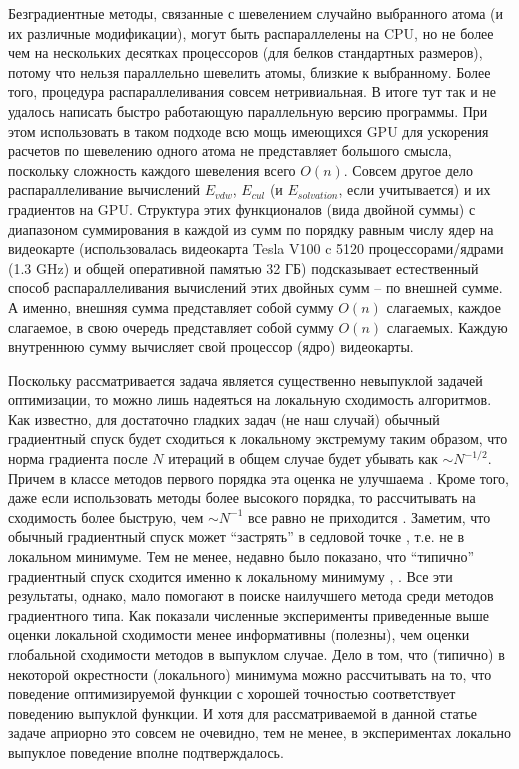   Безградиентные методы, связанные с шевелением случайно выбранного атома (и их различные модификации), могут быть распараллелены на CPU, но не более чем на нескольких десятках процессоров (для белков стандартных размеров), потому что нельзя параллельно шевелить атомы, близкие к выбранному. Более того, процедура распараллеливания совсем нетривиальная. В итоге тут так и не удалось написать быстро работающую параллельную версию программы. При этом использовать в таком подходе всю мощь имеющихся GPU для ускорения расчетов по шевелению одного атома не представляет большого смысла, поскольку сложность каждого шевеления всего ${O}\left( n \right)$. Совсем другое дело распараллеливание вычислений $E_{vdw}$, $E_{cul}$ (и $E_{solvation}$, если учитывается) и их градиентов на GPU. Структура этих функционалов (вида двойной суммы) с диапазоном суммирования в каждой из сумм по порядку равным числу ядер на видеокарте (использовалась видеокарта Tesla V100 c 5120 процессорами/ядрами (1.3 GHz) и общей оперативной памятью 32 ГБ) подсказывает естественный способ распараллеливания вычислений этих двойных сумм -- по внешней сумме. А именно, внешняя сумма представляет собой сумму ${O}\left( n \right)$ слагаемых, каждое слагаемое, в свою очередь представляет собой сумму ${O}\left( n \right)$ слагаемых. Каждую внутреннюю сумму вычисляет свой процессор (ядро) видеокарты. 

  Поскольку рассматривается задача является существенно невыпуклой задачей оптимизации, то можно лишь надеяться на локальную сходимость алгоритмов. Как известно, для достаточно гладких задач (не наш случай) обычный градиентный спуск будет сходиться к локальному экстремуму таким образом, что норма градиента после $N$ итераций в общем случае будет убывать как $\sim N^{-1/2}$. Причем в классе методов первого порядка эта оценка не улучшаема  \cite{carmon2017lower2}. Кроме того, даже если использовать методы более высокого порядка, то рассчитывать на сходимость более быструю, чем $\sim N^{-1}$ все равно не приходится \cite{carmon2017lower1}. Заметим, что обычный градиентный спуск может ``застрять'' в седловой точке \cite{nesterov2013introductory}, т.е. не в локальном минимуме. Тем не менее, недавно было показано, что ``типично'' градиентный спуск сходится именно к локальному минимуму \cite{lee2017first}, \cite{lee2016gradient}. Все эти результаты, однако, мало помогают в поиске наилучшего метода среди методов градиентного типа. Как показали численные эксперименты приведенные выше оценки локальной сходимости менее информативны (полезны), чем оценки глобальной сходимости методов в выпуклом случае. Дело в том, что (типично) в некоторой окрестности (локального) минимума можно рассчитывать на то, что поведение оптимизируемой функции с хорошей точностью соответствует поведению выпуклой функции. И хотя для рассматриваемой в  данной статье задаче априорно это совсем не очевидно, тем не менее, в экспериментах локально выпуклое поведение вполне подтверждалось.  

